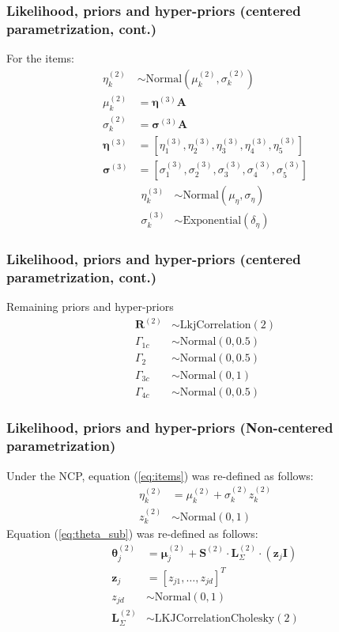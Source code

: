 \documentclass[arial,12pt,xcolor=dvipsnames]{beamer}
\begin{document}
%
\begin{frame}
	\frametitle{Likelihood, priors and hyper-priors
		(centered parametrization, cont.)}
	For the items:
	\begin{align}
		\eta^{(2)}_{k} &\sim \text{Normal} \left( \mu^{(2)}_{k}, \sigma^{(2)}_{k} \right) \label{eq:items} \\
		\mu^{(2)}_{k} &= \pmb{\eta}^{(3)} \mathbf{A} \label{eq:mu_items} \\
		\sigma^{(2)}_{k} &= \pmb{\sigma}^{(3)} \mathbf{A} \label{eq:sigma_items} \\
		\pmb{\eta}^{(3)} &= [ \eta^{(3)}_{1}, \eta^{(3)}_{2}, \eta^{(3)}_{3}, \eta^{(3)}_{4}, \eta^{(3)}_{5} ] \\
		\pmb{\sigma}^{(3)} &= [ \sigma^{(3)}_{1}, \sigma^{(3)}_{2}, \sigma^{(3)}_{3}, \sigma^{(3)}_{4}, \sigma^{(3)}_{5} ]
	\end{align}
	\begin{align}
		\eta^{(3)}_{k} &\sim \text{Normal} \left( \mu_{\eta}, \sigma_{\eta} \right) \\
		\sigma^{(3)}_{k} &\sim \text{Exponential} \left( \delta_{\eta} \right)
	\end{align}
\end{frame}
%
\begin{frame}
	\frametitle{Likelihood, priors and hyper-priors
		(centered parametrization, cont.)}
	Remaining priors and hyper-priors
	\begin{align}
		\boldsymbol{R}^{(2)} &\sim \text{LkjCorrelation}( 2 ) \\
		\Gamma_{1c} &\sim \text{Normal}( 0, 0.5 ) \\
		\Gamma_{2} &\sim \text{Normal}( 0, 0.5 ) \\
		\Gamma_{3c} &\sim \text{Normal}( 0, 1 ) \\
		\Gamma_{4c} &\sim \text{Normal}( 0, 0.5 ) 
	\end{align}
\end{frame}
%
\begin{frame}
	\frametitle{Likelihood, priors and hyper-priors
		(Non-centered parametrization)}
	Under the NCP, equation (\ref{eq:items}) was re-defined as follows:
	\begin{align}
		\eta^{(2)}_{k} &= \mu^{(2)}_{k} + \sigma^{(2)}_{k} z^{(2)}_{k} \\
		z^{(2)}_{k} &\sim \text{Normal}(0,1)
	\end{align}
	Equation (\ref{eq:theta_sub}) was re-defined as follows:
	\begin{align}
		\boldsymbol{\theta}^{(2)}_{j} &= \boldsymbol{\mu}^{(2)}_{j} + \boldsymbol{S}^{(2)} \cdot \boldsymbol{L}^{(2)}_{\Sigma} \cdot  (\mathbf{z}_{j} \mathbf{I}) \\
		\mathbf{z}_{j} &= [ z_{j1}, \dots, z_{jd}]^{T} \\
		z_{jd} &\sim \text{Normal}(0,1) \\
		\boldsymbol{L}^{(2)}_{\Sigma} &\sim \text{LKJCorrelationCholesky}(2)
	\end{align}
\end{frame}
\end{document}
